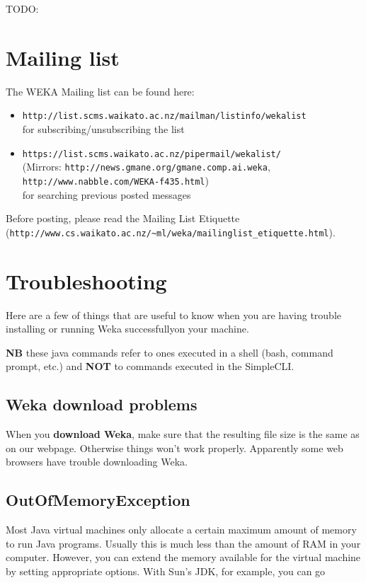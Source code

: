 
TODO:

\section{Mailing list}
The WEKA Mailing list can be found here:

\begin{itemize}
\item \verb=http://list.scms.waikato.ac.nz/mailman/listinfo/wekalist=\\
for subscribing/unsubscribing the list
\item \verb=https://list.scms.waikato.ac.nz/pipermail/wekalist/=\\
(Mirrors: \verb=http://news.gmane.org/gmane.comp.ai.weka=, \verb=http://www.nabble.com/WEKA-f435.html=)\\
for searching previous posted messages
\end{itemize}

\noindent Before posting, please read the Mailing List Etiquette\\
(\verb=http://www.cs.waikato.ac.nz/~ml/weka/mailinglist_etiquette.html=).



\section{Troubleshooting}
Here are a few of things that are useful to know when you are having
trouble installing or running Weka successfullyon your machine.

\textbf{NB} these java commands refer to ones executed in a shell
(bash, command prompt, etc.) and \textbf{NOT} to commands executed in the
SimpleCLI.

\subsection{Weka download problems}
When you \textbf{download Weka}, make sure that the resulting file size is the
same as on our webpage. Otherwise things won't work
properly. Apparently some web browsers have trouble downloading Weka.

\subsection{OutOfMemoryException}
Most Java virtual machines only allocate a certain maximum amount of
memory to run Java programs. Usually this is much less than the amount
of RAM in your computer. However, you can extend the memory available
for the virtual machine by setting appropriate options. With Sun's
JDK, for example, you can go\\

